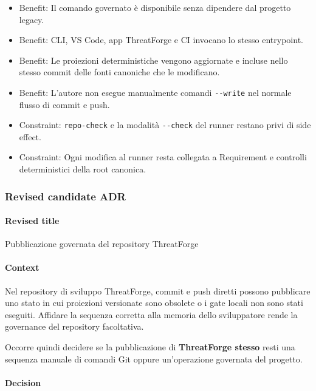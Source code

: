 \documentclass[
  10pt,
]{article}
\providecommand{\tightlist}{%
  \setlength{\itemsep}{0pt}\setlength{\parskip}{0pt}}
\begin{document}
\begin{itemize}
\tightlist
\item
  Benefit: Il comando governato è disponibile senza dipendere dal
  progetto legacy.
\item
  Benefit: CLI, VS Code, app ThreatForge e CI invocano lo stesso
  entrypoint.
\item
  Benefit: Le proiezioni deterministiche vengono aggiornate e incluse
  nello stesso commit delle fonti canoniche che le modificano.
\item
  Benefit: L'autore non esegue manualmente comandi \texttt{-\/-write}
  nel normale flusso di commit e push.
\item
  Constraint: \texttt{repo-check} e la modalità \texttt{-\/-check} del
  runner restano privi di side effect.
\item
  Constraint: Ogni modifica al runner resta collegata a Requirement e
  controlli deterministici della root canonica.
\end{itemize}

\subsubsection{Revised candidate ADR}\label{revised-candidate-adr-10}

\paragraph{Revised title}\label{revised-title-10}

Pubblicazione governata del repository ThreatForge

\paragraph{Context}\label{context-21}

Nel repository di sviluppo ThreatForge, commit e push diretti possono
pubblicare uno stato in cui proiezioni versionate sono obsolete o i gate
locali non sono stati eseguiti. Affidare la sequenza corretta alla
memoria dello sviluppatore rende la governance del repository
facoltativa.

Occorre quindi decidere se la pubblicazione di \textbf{ThreatForge
stesso} resti una sequenza manuale di comandi Git oppure un'operazione
governata del progetto.

\paragraph{Decision}\label{decision-21}
\end{document}
